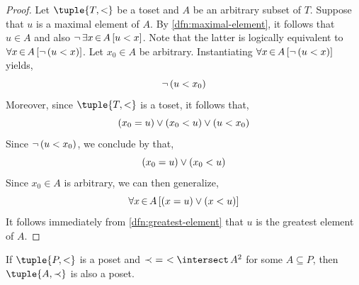 \begin{proof}
    Let \( \tuple{T, <} \) be a toset and \( A \) be an arbitrary subset of \( T \). Suppose that \( u \) is a maximal element of \( A \).
    By \cref{dfn:maximal-element}, it follows that \( u \in A \) and also \( \lnot \, \exists x\,{\in}\,A \, \mleft[ u < x \mright] \). Note that
    the latter is logically equivalent to \( \forall x\,{\in}\,A \, \mleft[ \lnot \, \mleft( u < x \mright) \mright] \).
    Let \( x_{0} \in A \) be arbitrary. Instantiating \( \forall x\,{\in}\,A \, \mleft[ \lnot \, \mleft( u < x \mright) \mright] \) yields,
    \begin{equation*}
        \lnot \, \mleft( u < x_{0} \mright)
    \end{equation*}
    Moreover, since \( \tuple{T,<} \) is a toset, it follows that,
    \begin{equation*}
        \mleft( x_{0} = u \mright) \lor \mleft( x_{0} < u \mright) \lor \mleft( u < x_{0} \mright)
    \end{equation*}
    Since \( \lnot \, \mleft( u < x_{0} \mright) \), we conclude by  that,
    \begin{equation*}
        \mleft( x_{0} = u \mright) \lor \mleft( x_{0} < u \mright)
    \end{equation*}
    Since \( x_{0} \in A \) is arbitrary, we can then generalize,
    \begin{equation*}
        \forall x\,{\in}\,A \, \mleft[ \mleft( x = u \mright) \lor \mleft( x < u \mright) \mright]
    \end{equation*}
    It follows immediately from \cref{dfn:greatest-element} that \( u \) is the greatest element of \( A \).
\end{proof}

\begin{thm}
    \label{thm:any-subset-of-a-poset-forms-a-poset}
    If \( \tuple{P, <} \) is a poset and \( \prec \,\,=\,\, < \intersect \, A^{2} \) for some \( A \subseteq P \),
    then \( \tuple{A, \prec} \) is also a poset.
\end{thm}

